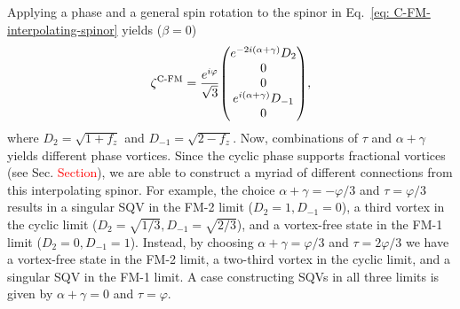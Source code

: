 Applying a phase and a general spin rotation to the spinor in
Eq.~\eqref{eq: C-FM-interpolating-spinor} yields (\(\beta = 0\))
\begin{equation}\label{eq: C-FM-general-spinor}
    \zeta^\text{C-FM} = \frac{e^{i\varphi}}{\sqrt{3}}\mqty(
    e^{-2i(\alpha+\gamma)}D_2 \\
    0 \\
    0 \\
    e^{i(\alpha+\gamma)}D_{-1} \\
    0
    ),
\end{equation}
where \(D_2 = \sqrt{1 + f_z}\) and
\(D_{-1} = \sqrt{2 - f_z}\).
Now, combinations of \(\tau \) and \(\alpha+\gamma \) yields different phase
vortices.
Since the cyclic phase supports fractional vortices
(see Sec. \textcolor{red}{Section}), we are able to construct a myriad of
different connections from this interpolating spinor.
For example, the choice \(\alpha+\gamma=-\varphi/3\) and \(\tau=\varphi/3\)
results in a singular SQV in the FM-2 limit (\(D_2 = 1, D_{-1} = 0\)),
a third vortex in the cyclic limit (\(D_2 = \sqrt{1/3}, D_{-1} = \sqrt{2/3}\)),
and a vortex-free state in the FM-1 limit (\(D_2 = 0, D_{-1} = 1\)).
Instead, by choosing \(\alpha + \gamma = \varphi/3\) and \(\tau = 2\varphi/3\)
we have a vortex-free state in the FM-2 limit, a two-third vortex in the cyclic
limit, and a singular SQV in the FM-1 limit.
A case constructing SQVs in all three limits is given by \(\alpha+\gamma = 0\)
and \(\tau = \varphi \).

